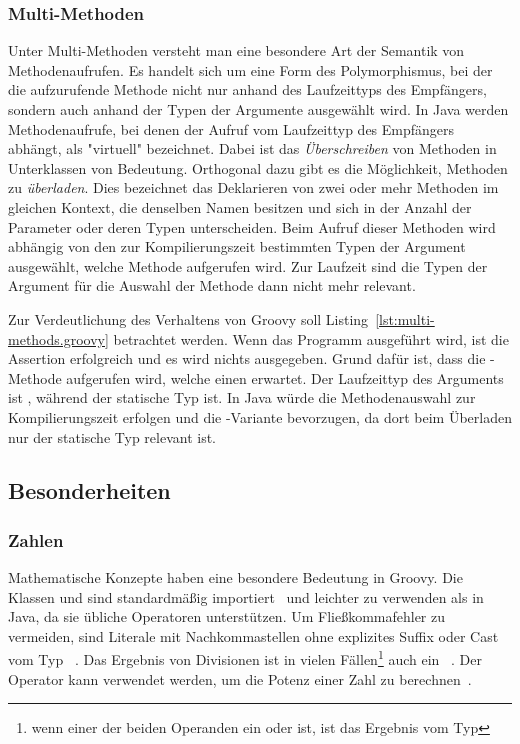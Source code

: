 	\subsubsection{Multi-Methoden}

	Unter Multi-Methoden versteht man eine besondere Art der Semantik von Methodenaufrufen.
	Es handelt sich um eine Form des Polymorphismus, bei der die aufzurufende Methode nicht nur anhand des Laufzeittyps des Empfängers, sondern auch anhand der Typen der Argumente ausgewählt wird.
	In Java werden Methodenaufrufe, bei denen der Aufruf vom Laufzeittyp des Empfängers abhängt, als "virtuell" bezeichnet.
	Dabei ist das \emph{Überschreiben} von Methoden in Unterklassen von Bedeutung.
	Orthogonal dazu gibt es die Möglichkeit, Methoden zu \emph{überladen}.
	Dies bezeichnet das Deklarieren von zwei oder mehr Methoden im gleichen Kontext, die denselben Namen besitzen und sich in der Anzahl der Parameter oder deren Typen unterscheiden.
	Beim Aufruf dieser Methoden wird abhängig von den zur Kompilierungszeit bestimmten Typen der Argument ausgewählt, welche Methode aufgerufen wird.
	Zur Laufzeit sind die Typen der Argument für die Auswahl der Methode dann nicht mehr relevant.


	Zur Verdeutlichung des Verhaltens von Groovy soll Listing~\ref{lst:multi-methods.groovy} betrachtet werden.
	Wenn das Programm ausgeführt wird, ist die Assertion erfolgreich und es wird nichts ausgegeben.
	Grund dafür ist, dass die -Methode aufgerufen wird, welche einen  erwartet.
	Der Laufzeittyp des Arguments  ist , während der statische Typ  ist.
	In Java würde die Methodenauswahl zur Kompilierungszeit erfolgen und die -Variante bevorzugen, da dort beim Überladen nur der statische Typ relevant ist.

	\subsection{Besonderheiten}\label{subsec:besonderheiten}

	\subsubsection{Zahlen}\label{subsubsec:zahlen}

	Mathematische Konzepte haben eine besondere Bedeutung in Groovy.
	Die Klassen  und  sind standardmäßig importiert~\cite[{Abs.} 1.]{groovy-lang:differences} und leichter zu verwenden als in Java, da sie übliche Operatoren unterstützen.
	Um Fließkommafehler zu vermeiden, sind Literale mit Nachkommastellen ohne explizites Suffix oder Cast vom Typ ~\cite[{Abs.} 5.2.]{groovy-lang:syntax}.
	Das Ergebnis von Divisionen ist in vielen Fällen\footnote{wenn einer der beiden Operanden ein  oder  ist, ist das Ergebnis vom Typ } auch ein ~\cite[{Abs.} 5.5.1.]{groovy-lang:syntax}.
	Der Operator \code{**} kann verwendet werden, um die Potenz einer Zahl zu berechnen~\cite[{Abs.} 5.5.2.]{groovy-lang:syntax}.

